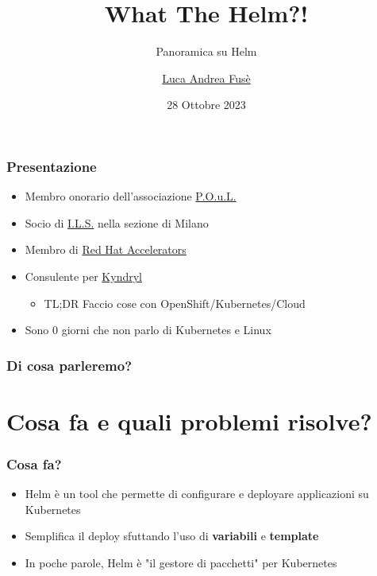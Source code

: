 \documentclass{beamer}
\title{What The Helm?!}
\subtitle{Panoramica su Helm}
\author{\href{https://www.linkedin.com/in/luca-af}{Luca Andrea Fusè}}
\date{28 Ottobre 2023}
\begin{document}
\renewcommand{\CancelColor}{\color{red}}

\begin{frame}
    \titlepage
\end{frame}
 
 \begin{frame}
     \frametitle{Presentazione}

    \begin{itemize}
        \item Membro onorario dell'associazione \href{https://www.poul.org}{P.O.u.L.}
        \item Socio di \href{https://www.ils.org}{I.L.S.} nella sezione di Milano
        \item Membro di \href{https://access.redhat.com/accelerators}{Red Hat Accelerators}
        \item Consulente per \href{https://www.kyndryl.com}{Kyndryl}
        \begin{itemize}\item TL;DR Faccio cose con OpenShift/Kubernetes/Cloud \end{itemize}
        \item Sono 0 giorni che non parlo di Kubernetes e Linux
    \end{itemize}
 \end{frame}
 
 \begin{frame}
   \frametitle{Di cosa parleremo?}
   \tableofcontents
   
  \end{frame}
  
\section{Cosa fa e quali problemi risolve?}
\begin{frame}
\frametitle{Cosa fa?}
 \begin{itemize}
    \item Helm è un tool che permette di configurare e deployare applicazioni su Kubernetes
    \item Semplifica il deploy sfuttando l'uso di \textbf{variabili} e \textbf{template}
    \item In poche parole, Helm è "il gestore di pacchetti" per Kubernetes
  \end{itemize}
\end{frame}
\end{document}
